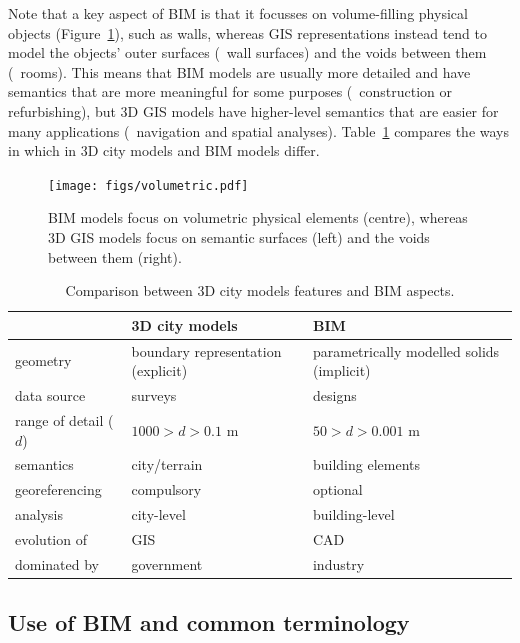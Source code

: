 Note that a key aspect of BIM is that it focusses on volume-filling physical objects (Figure~\ref{fig:volumetric}), such as walls, whereas GIS representations instead tend to model the objects' outer surfaces (\eg\ wall surfaces) and the voids between them (\eg\ rooms).
This means that BIM models are usually more detailed and have semantics that are more meaningful for some purposes (\eg\ construction or refurbishing), but 3D GIS models have higher-level semantics that are easier for many applications (\eg\  navigation and spatial analyses).
Table~\ref{tab:vs} compares the ways in which in 3D city models and BIM models differ.

\begin{figure}
\centering
\texttt{[image: figs/volumetric.pdf]}
\caption[BIM models vs.\ 3D GIS models]{BIM models focus on volumetric physical elements (centre), whereas 3D GIS models focus on semantic surfaces (left) and the voids between them (right).}%
\label{fig:volumetric}
\end{figure}

\begin{table}
	\centering
	\small
	\begin{tabular}{m{2.3cm}m{3.5cm}m{3.5cm}}
		\toprule
		& \textbf{3D city models} & \textbf{BIM}  \\ \midrule
		geometry & boundary representation (explicit) & parametrically modelled solids (implicit) \\ \addlinespace 
		data source & surveys & designs \\ \addlinespace 
		range of detail ($d$) & $1000>d>0.1$ m & $50>d>0.001$ m \\ \addlinespace 
		semantics & city/terrain & building elements  \\ \addlinespace 
		georeferencing & compulsory & optional  \\ \addlinespace 
		analysis & city-level & building-level \\ \addlinespace 
		evolution of & GIS & CAD \\ \addlinespace 
		dominated by & government & industry \\ \bottomrule
	\end{tabular}
	\caption{Comparison between 3D city models features and BIM aspects.}%
	\label{tab:vs}
\end{table}

\subsection{Use of BIM and common terminology}

